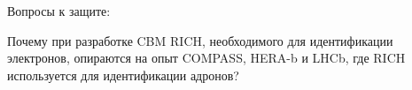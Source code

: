 Вопросы к защите:

Почему при разработке CBM RICH, необходимого для идентификации электронов, опираются на опыт COMPASS, HERA-b и LHCb, где RICH используется для идентификации адронов?